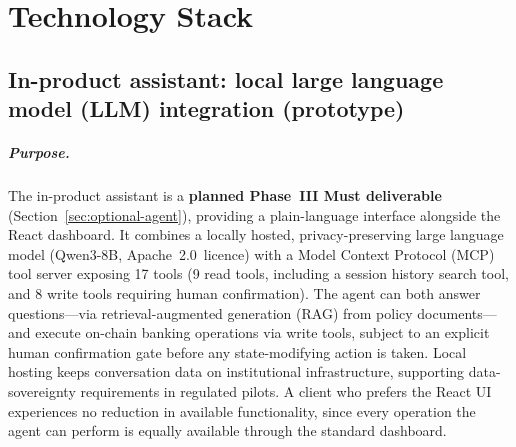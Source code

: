 \documentclass[12pt,a4paper]{report}
\begin{document}
\chapter{Technology Stack}

\section{In-product assistant: local large language model (LLM) integration (prototype)}
\label{sec:local-llm}

\paragraph{Purpose.}
The in-product assistant is a \textbf{planned Phase~III Must deliverable} (Section~\ref{sec:optional-agent}), providing a plain-language interface alongside the React dashboard. It combines a locally hosted, privacy-preserving large language model (Qwen3-8B, Apache~2.0~licence) with a Model Context Protocol (MCP) tool server exposing 17 tools (9 read tools, including a session history search tool, and 8 write tools requiring human confirmation). The agent can both answer questions---via retrieval-augmented generation (RAG) from policy documents---and execute on-chain banking operations via write tools, subject to an explicit human confirmation gate before any state-modifying action is taken. Local hosting keeps conversation data on institutional infrastructure, supporting data-sovereignty requirements in regulated pilots. A client who prefers the React UI experiences no reduction in available functionality, since every operation the agent can perform is equally available through the standard dashboard.
\end{document}
